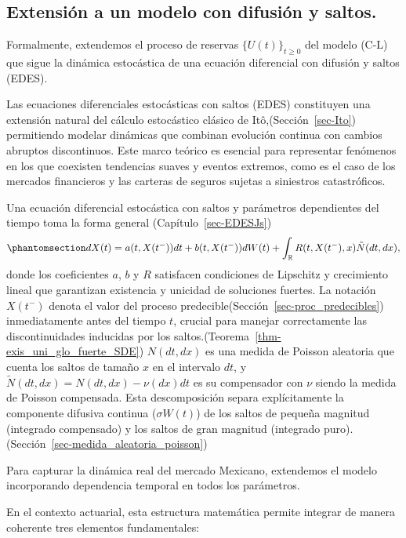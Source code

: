 \documentclass[
  spanish,
  us-letterpaper,
]{scrreprt}
\theoremstyle{plain}
\theoremstyle{plain}
\theoremstyle{definition}
\theoremstyle{remark}
\begin{document}
\subsection{Extensión a un modelo con difusión y
saltos.}\label{extensiuxf3n-a-un-modelo-con-difusiuxf3n-y-saltos.}

Formalmente, extendemos el proceso de reservas \(\{U(t)\}_{t \geq 0}\)
del modelo (C-L) que sigue la dinámica estocástica de una ecuación
diferencial con difusión y saltos (EDES).

Las ecuaciones diferenciales estocásticas con saltos (EDES) constituyen
una extensión natural del cálculo estocástico clásico de
Itô,(Sección~\ref{sec-Ito}) permitiendo modelar dinámicas que combinan
evolución continua con cambios abruptos discontinuos. Este marco teórico
es esencial para representar fenómenos en los que coexisten tendencias
suaves y eventos extremos, como es el caso de los mercados financieros y
las carteras de seguros sujetas a siniestros catastróficos.

Una ecuación diferencial estocástica con saltos y parámetros
dependientes del tiempo toma la forma general
(Capítulo~\ref{sec-EDESJs})
\begin{equation}\protect\phantomsection\label{eq-9}{dX(t) = a(t,X(t^-))dt + b(t,X(t^-))dW(t) + \int_{\mathbb{R}} R(t,X(t^-),x) \tilde{N}(dt,dx),}\end{equation}
donde los coeficientes \(a\), \(b\) y \(R\) satisfacen condiciones de
Lipschitz y crecimiento lineal que garantizan existencia y unicidad de
soluciones fuertes. La notación \(X(t^-)\) denota el valor del proceso
predecible(Sección~\ref{sec-proc_predecibles}) inmediatamente antes del
tiempo \(t\), crucial para manejar correctamente las discontinuidades
inducidas por los saltos.(Teorema~\ref{thm-exis_uni_glo_fuerte_SDE})
\(N(dt,dx)\) es una medida de Poisson aleatoria que cuenta los saltos de
tamaño \(x\) en el intervalo \(dt\), y
\(\tilde{N}(dt,dx) = N(dt,dx) - \nu(dx)dt\) es su compensador con
\(\nu\) siendo la medida de Poisson compensada. Esta descomposición
separa explícitamente la componente difusiva continua (\(\sigma W(t)\))
de los saltos de pequeña magnitud (integrado compensado) y los saltos de
gran magnitud (integrado
puro).(Sección~\ref{sec-medida_aleatoria_poisson})

Para capturar la dinámica real del mercado Mexicano, extendemos el
modelo incorporando dependencia temporal en todos los parámetros.

En el contexto actuarial, esta estructura matemática permite integrar de
manera coherente tres elementos fundamentales:
\end{document}
